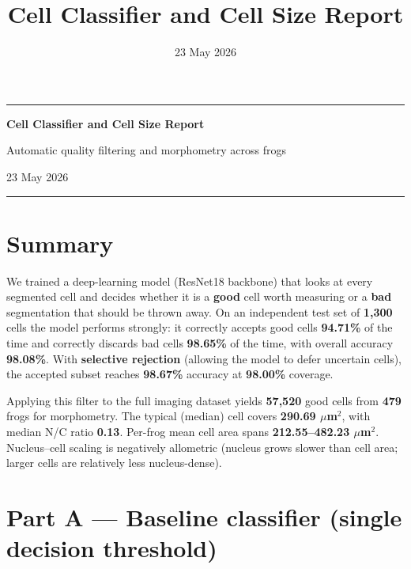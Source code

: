 \documentclass[
  english,
]{article}
\title{Cell Classifier and Cell Size Report}
\author{}
\date{23 May 2026}
\begin{document}
\begin{titlepage}
\thispagestyle{empty}
\centering
\vspace*{2.2cm}
{\color{ReportAccent}\rule{\textwidth}{2pt}\par}
\vspace{1.4cm}
{\Huge\bfseries\color{ReportAccent} Cell Classifier and Cell Size Report\par}
\vspace{1.2cm}
{\large\color{ReportMuted} Automatic quality filtering and morphometry across frogs\par}
\vfill
{\large 23 May 2026\par}
\vspace{2cm}
{\color{ReportAccent}\rule{\textwidth}{2pt}\par}
\end{titlepage}
\setcounter{page}{1}

\section{Summary}\label{summary}
\begin{abstractbox}
We trained a deep-learning model (ResNet18 backbone) that looks at every
segmented cell and decides whether it is a \textbf{good} cell worth
measuring or a \textbf{bad} segmentation that should be thrown away. On
an independent test set of \textbf{1,300} cells the model performs
strongly: it correctly accepts good cells \textbf{94.71\%} of the time
and correctly discards bad cells \textbf{98.65\%} of the time, with
overall accuracy \textbf{98.08\%}. With \textbf{selective rejection}
(allowing the model to defer uncertain cells), the accepted subset
reaches \textbf{98.67\%} accuracy at \textbf{98.00\%} coverage.

Applying this filter to the full imaging dataset yields \textbf{57,520}
good cells from \textbf{479} frogs for morphometry. The typical (median)
cell covers \textbf{290.69 \(\mu\)m\(^2\)}, with median N/C ratio
\textbf{0.13}. Per-frog mean cell area spans \textbf{212.55--482.23
\(\mu\)m\(^2\)}. Nucleus--cell scaling is negatively allometric (nucleus
grows slower than cell area; larger cells are relatively less
nucleus-dense).
\end{abstractbox}

\section{Part A --- Baseline classifier (single decision
threshold)}\label{part-a-baseline-classifier-single-decision-threshold}
\end{document}
